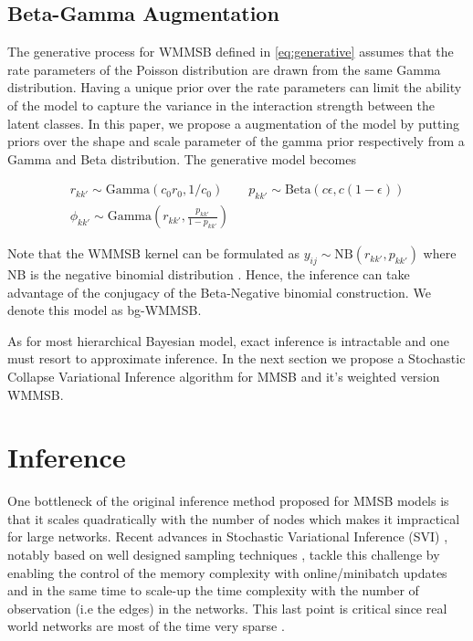 \subsection{Beta-Gamma Augmentation}

The generative process for WMMSB defined in \eqref{eq:generative} assumes that the rate parameters of the Poisson distribution are drawn from the same Gamma distribution. Having a unique prior over the rate parameters can limit the ability of the model to capture the variance in the interaction strength between the latent classes. In this paper, we propose a augmentation of the model by putting priors over the shape and scale parameter of the gamma prior respectively from a Gamma and Beta distribution. The generative model becomes

\begin{gather*}
r_{kk'} \sim \textrm{Gamma}(c_0r_0, 1/c_0) \qquad p_{kk'} \sim \textrm{Beta}(c\epsilon, c(1-\epsilon)) \\
\phi_{kk'} \sim \textrm{Gamma}(r_{kk'}, \frac{p_{kk'}}{1-p_{kk'}})
\end{gather*}

Note that the WMMSB kernel can be formulated as $y_{ij} \sim \textrm{NB}(r_{kk'}, p_{kk'})$ where NB is the negative binomial distribution \cite{zhou2015negative} \cite{zhou2012beta}. Hence, the inference can take advantage of the conjugacy of the Beta-Negative binomial construction. We denote this model as bg-WMMSB.

As for most hierarchical Bayesian model, exact inference is intractable and one must resort to approximate inference. In the next section we propose a Stochastic Collapse Variational Inference algorithm for MMSB and it's weighted version WMMSB.


\section{Inference}

One bottleneck of the original inference method proposed for MMSB models is that it scales quadratically with the number of nodes which makes it impractical for large networks. Recent advances in Stochastic Variational Inference (SVI) \cite{hoffman2013stochastic}, notably based on well designed sampling techniques \cite{gopalan2013efficient}\cite{kim2013efficient}, tackle this challenge by enabling the control of the memory complexity with online/minibatch updates and in the same time to scale-up the time complexity with the number of observation (i.e the edges) in the networks. This last point is critical since real world networks are most of the time very sparse \cite{barabasi_burst}. 

